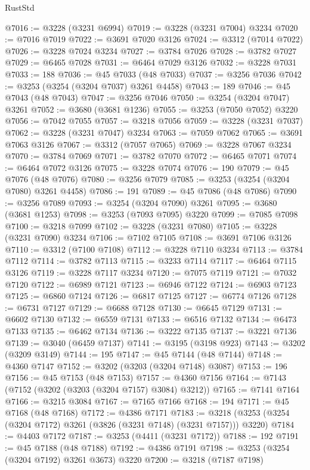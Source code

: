 \begin{lexlean}{RustStd}
\begin{coremodule}
@7016 := @3228 (@3231 @6994)
@7019 := @3228 (@3231 @7004) @3234
@7020 := @7016 @7019
@7022 := @3691 @7020 @3126
@7024 := @3312 (@7014 @7022)
@7026 := @3228 @7024 @3234
@7027 := @3784 @7026
@7028 := @3782 @7027
@7029 := @6465 @7028
@7031 := @6464 @7029 @3126
@7032 := @3228 @7031
@7033 := 188
@7036 := @45 @7033 (@48 @7033)
@7037 := @3256 @7036
@7042 := @3253 (@3254 (@3204 @7037) @3261 @4458)
@7043 := 189
@7046 := @45 @7043 (@48 @7043)
@7047 := @3256 @7046
@7050 := @3254 (@3204 @7047) @3261
@7052 := @3680 (@3681 @1236)
@7055 := @3253 (@7050 @7052) @3220
@7056 := @7042 @7055
@7057 := @3218 @7056
@7059 := @3228 (@3231 @7037)
@7062 := @3228 (@3231 @7047) @3234
@7063 := @7059 @7062
@7065 := @3691 @7063 @3126
@7067 := @3312 (@7057 @7065)
@7069 := @3228 @7067 @3234
@7070 := @3784 @7069
@7071 := @3782 @7070
@7072 := @6465 @7071
@7074 := @6464 @7072 @3126
@7075 := @3228 @7074
@7076 := 190
@7079 := @45 @7076 (@48 @7076)
@7080 := @3256 @7079
@7085 := @3253 (@3254 (@3204 @7080) @3261 @4458)
@7086 := 191
@7089 := @45 @7086 (@48 @7086)
@7090 := @3256 @7089
@7093 := @3254 (@3204 @7090) @3261
@7095 := @3680 (@3681 @1253)
@7098 := @3253 (@7093 @7095) @3220
@7099 := @7085 @7098
@7100 := @3218 @7099
@7102 := @3228 (@3231 @7080)
@7105 := @3228 (@3231 @7090) @3234
@7106 := @7102 @7105
@7108 := @3691 @7106 @3126
@7110 := @3312 (@7100 @7108)
@7112 := @3228 @7110 @3234
@7113 := @3784 @7112
@7114 := @3782 @7113
@7115 := @3233 @7114
@7117 := @6464 @7115 @3126
@7119 := @3228 @7117 @3234
@7120 := @7075 @7119
@7121 := @7032 @7120
@7122 := @6989 @7121
@7123 := @6946 @7122
@7124 := @6903 @7123
@7125 := @6860 @7124
@7126 := @6817 @7125
@7127 := @6774 @7126
@7128 := @6731 @7127
@7129 := @6688 @7128
@7130 := @6645 @7129
@7131 := @6602 @7130
@7132 := @6559 @7131
@7133 := @6516 @7132
@7134 := @6473 @7133
@7135 := @6462 @7134
@7136 := @3222 @7135
@7137 := @3221 @7136
@7139 := @3040 (@6459 @7137)
@7141 := @3195 (@3198 @923)
@7143 := @3202 (@3209 @3149)
@7144 := 195
@7147 := @45 @7144 (@48 @7144)
@7148 := @4360 @7147
@7152 := @3202 (@3203 (@3204 @7148) @3087)
@7153 := 196
@7156 := @45 @7153 (@48 @7153)
@7157 := @4360 @7156
@7164 := @7143 (@7152 (@3202 (@3203 (@3204 @7157) @3084) @3212))
@7165 := @7141 @7164
@7166 := @3215 @3084
@7167 := @7165 @7166
@7168 := 194
@7171 := @45 @7168 (@48 @7168)
@7172 := @4386 @7171
@7183 := @3218 (@3253 (@3254 (@3204 @7172) @3261 (@3826 (@3231 @7148) (@3231 @7157))) @3220)
@7184 := @4403 @7172
@7187 := @3253 (@4411 (@3231 @7172))
@7188 := 192
@7191 := @45 @7188 (@48 @7188)
@7192 := @4386 @7191
@7198 := @3253 (@3254 (@3204 @7192) @3261 @3673) @3220
@7200 := @3218 (@7187 @7198)

\end{coremodule}
\end{lexlean}
